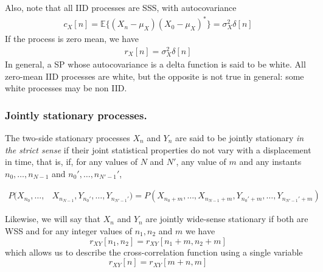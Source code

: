 Also, note that all IID processes are SSS, with autocovariance
\begin{align}
c_X[n] = \mathbb{E}\{(X_n-\mu_X)(X_0-\mu_X)^*\} = \sigma_X^2 \delta[n]
\end{align}
If the process is zero mean, we have
\begin{align}
\label{eq:rxwhiteprocess}
r_X[n] = \sigma_X^2 \delta[n]
\end{align}
In general, a SP whose autocovariance is a delta function is said to be white. All zero-mean IID processes are white, but the opposite is not true in general: some white processes may be non IID.

\subsubsection{Jointly stationary processes.}

The two-side stationary processes $X_n$ and $Y_n$ are said to be jointly stationary \textsl{in the strict sense} if their joint statistical 
properties do not vary with a displacement in time, that is, if, for any values of $N$ and $N'$, any value of $m$ and any instants $n_0,\ldots,n_{N-1}$ and $n_0',\ldots,n_{N'-1}'$,

\begin{align}
P(X_{n_0}, \ldots, & X_{n_{N-1}}, Y_{n_0'}, \ldots, Y_{n_{N'-1}'}) 
           =  P(X_{n_0 + m}, \ldots, X_{n_{N-1} + m}, Y_{n_0' + m}, \ldots, Y_{n_{N'-1}' + m})
\end{align}

Likewise, we will say that $X_n$ and $Y_n$ are jointly wide-sense stationary if both are WSS and for any integer values of $n_1, n_2$ and $m$ we have
\begin{equation}
r_{XY}[n_1,n_2] = r_{XY}[n_1 + m, n_2 + m]
\end{equation}
which allows us to describe the cross-correlation function using a single variable
\begin{equation}
r_{XY}[n] = r_{XY}[m + n, m]
\end{equation}

